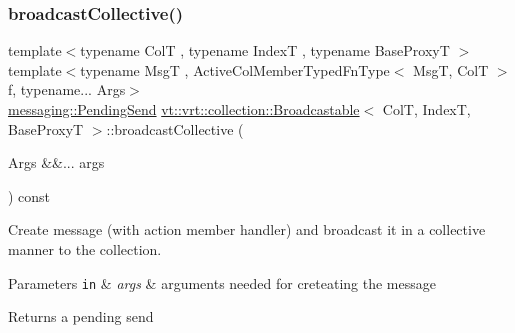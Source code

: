 \subsubsection{\texorpdfstring{broadcast\+Collective()}{broadcastCollective()}\hspace{0.1cm}{\footnotesize\ttfamily [2/2]}}
{\footnotesize\ttfamily template$<$typename ColT , typename IndexT , typename Base\+ProxyT $>$ \\
template$<$typename MsgT , Active\+Col\+Member\+Typed\+Fn\+Type$<$ Msg\+T, Col\+T $>$ f, typename... Args$>$ \\
\hyperlink{structvt_1_1messaging_1_1_pending_send}{messaging\+::\+Pending\+Send} \hyperlink{structvt_1_1vrt_1_1collection_1_1_broadcastable}{vt\+::vrt\+::collection\+::\+Broadcastable}$<$ ColT, IndexT, Base\+ProxyT $>$\+::broadcast\+Collective (\begin{DoxyParamCaption}\item[{Args \&\&...}]{args }\end{DoxyParamCaption}) const}



Create message (with action member handler) and broadcast it in a collective manner to the collection. 


\begin{DoxyParams}[1]{Parameters}
\mbox{\tt in}  & {\em args} & arguments needed for creteating the message\\
\hline
\end{DoxyParams}
\begin{DoxyReturn}{Returns}
a pending send 
\end{DoxyReturn}
\mbox{\label{structvt_1_1vrt_1_1collection_1_1_broadcastable_a70ec0f06ef5566c713a4d960a8faa39b}} 

